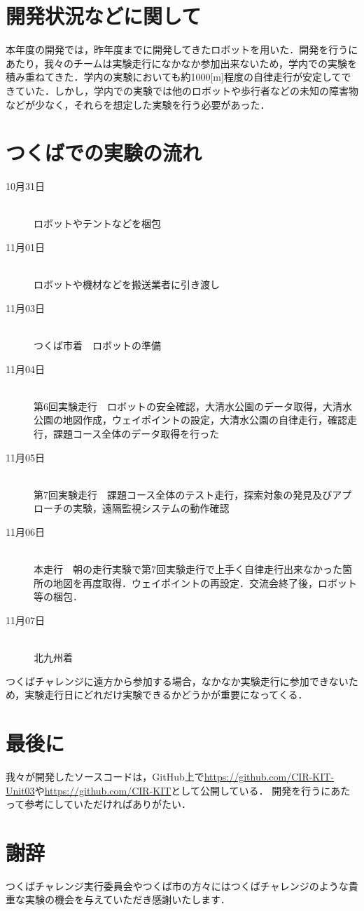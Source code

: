 \documentclass[10pt,a4paper]{jarticle}
\begin{document}
\section{開発状況などに関して}
本年度の開発では，昨年度までに開発してきたロボットを用いた．開発を行うにあたり，我々のチームは実験走行になかなか参加出来ないため，学内での実験を積み重ねてきた．学内の実験においても約1000[m]程度の自律走行が安定してできていた．しかし，学内での実験では他のロボットや歩行者などの未知の障害物などが少なく，それらを想定した実験を行う必要があった．

\section{つくばでの実験の流れ}
\begin{description}
 \item[10月31日]\mbox{}\\
	    ロボットやテントなどを梱包
 \item[11月01日]\mbox{}\\
	    ロボットや機材などを搬送業者に引き渡し
 \item[11月03日]\mbox{}\\
	    つくば市着　ロボットの準備
 \item[11月04日]\mbox{}\\
	    第6回実験走行　ロボットの安全確認，大清水公園のデータ取得，大清水公園の地図作成，ウェイポイントの設定，大清水公園の自律走行，確認走行，課題コース全体のデータ取得を行った
 \item[11月05日]\mbox{}\\
	    第7回実験走行　課題コース全体のテスト走行，探索対象の発見及びアプローチの実験，遠隔監視システムの動作確認
 \item[11月06日]\mbox{}\\
	    本走行　朝の走行実験で第7回実験走行で上手く自律走行出来なかった箇所の地図を再度取得．ウェイポイントの再設定．交流会終了後，ロボット等の梱包．
 \item[11月07日]\mbox{}\\
	    北九州着
\end{description}
つくばチャレンジに遠方から参加する場合，なかなか実験走行に参加できないため，実験走行日にどれだけ実験できるかどうかが重要になってくる．

\section{最後に}
我々が開発したソースコードは，GitHub上で\url{https://github.com/CIR-KIT-Unit03}や\url{https://github.com/CIR-KIT}として公開している．
開発を行うにあたって参考にしていただければありがたい．


\section*{謝辞}
つくばチャレンジ実行委員会やつくば市の方々にはつくばチャレンジのような貴重な実験の機会を与えていただき感謝いたします．
\end{document}
